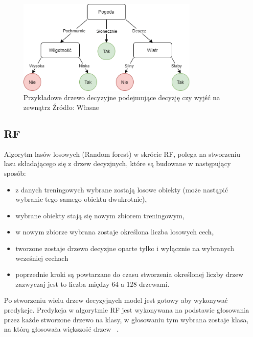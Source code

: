 \begin{figure}[h]
    \centering
    \includegraphics[width=0.8\textwidth]{./Img/BinaryTree.png}
    \caption{Przykładowe drzewo decyzyjne podejmujące decyzję czy wyjść na zewnątrz Źródło: Własne}
\end{figure}

\subsection{RF}
Algorytm lasów losowych (Random forest) w skrócie RF, polega na stworzeniu lasu składającego się z drzew decyzjnych, 
które są budowane w następujący sposób:
\begin{itemize}
    \item z danych treningowych wybrane zostają losowe obiekty (może nastąpić wybranie tego samego obiektu dwukrotnie),
    \item wybrane obiekty stają się nowym zbiorem treningowym,
    \item w nowym zbiorze wybrana zostaje określona liczba losowych cech,
    \item tworzone zostaje drzewo decyzjne oparte tylko i wyłącznie na wybranych wcześniej cechach
    \item poprzednie kroki są powtarzane do czasu stworzenia określonej liczby drzew zazwyczaj jest to 
    liczba między 64 a 128 drzewami. 
\end{itemize}
Po stworzeniu wielu drzew decyzyjnych model jest gotowy aby wykonywać predykcje.
Predykcja w algorytmie RF jest wykonywana na podstawie głosowania przez każde stworzone drzewo na klasy, w głosowaniu 
tym wybrana zostaje klasa, na którą głosowała większość drzew ~\cite{randomforest}.

